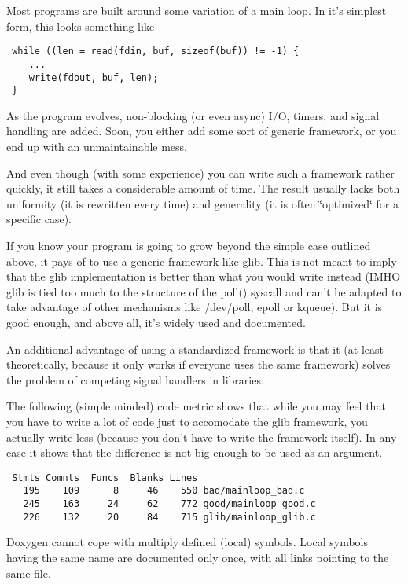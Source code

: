 Most programs are built around some variation of a main loop. In it's simplest form, this looks something like



\footnotesize\begin{verbatim} while ((len = read(fdin, buf, sizeof(buf)) != -1) {
	...
	write(fdout, buf, len);
 }
\end{verbatim}
\normalsize


As the program evolves, non-blocking (or even async) I/O, timers, and signal handling are added. Soon, you either add some sort of generic framework, or you end up with an unmaintainable mess.

And even though (with some experience) you can write such a framework rather quickly, it still takes a considerable amount of time. The result usually lacks both uniformity (it is rewritten every time) and generality (it is often \char`\"{}optimized\char`\"{} for a specific case).

If you know your program is going to grow beyond the simple case outlined above, it pays of to use a generic framework like glib. This is not meant to imply that the glib implementation is better than what you would write instead (IMHO glib is tied too much to the structure of the poll() syscall and can't be adapted to take advantage of other mechanisms like /dev/poll, epoll or kqueue). But it is good enough, and above all, it's widely used and documented.

An additional advantage of using a standardized framework is that it (at least theoretically, because it only works if everyone uses the same framework) solves the problem of competing signal handlers in libraries.

The following (simple minded) code metric shows that while you may feel that you have to write a lot of code just to accomodate the glib framework, you actually write less (because you don't have to write the framework itself). In any case it shows that the difference is not big enough to be used as an argument.



\footnotesize\begin{verbatim} Stmts Comnts  Funcs  Blanks Lines
   195    109      8     46    550 bad/mainloop_bad.c
   245    163     24     62    772 good/mainloop_good.c
   226    132     20     84    715 glib/mainloop_glib.c
\end{verbatim}
\normalsize




Doxygen cannot cope with multiply defined (local) symbols. Local symbols having the same name are documented only once, with all links pointing to the same file. 